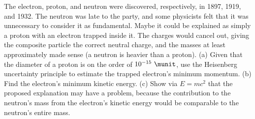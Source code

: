 The electron, proton, and neutron were discovered, respectively, in 1897, 1919, and 1932.
The neutron was late to the party, and 
some physicists felt that it was unnecessary to consider it as fundamental.
Maybe it could be explained
as simply a proton with an electron trapped inside it. The charges would cancel out,
giving the composite particle the correct neutral charge, and the masses at least
approximately made sense (a neutron is heavier than a proton). (a) Given that the
diameter of a proton is on the order of $10^{-15}\ \munit$, use the Heisenberg
uncertainty principle to estimate the trapped electron's minimum momentum.\answercheck\hwendpart
(b) Find the electron's minimum kinetic energy.\answercheck\hwendpart
(c) Show via $E=mc^2$ that the proposed explanation may have a problem,
because the
contribution to the neutron's mass from the electron's kinetic energy would be
comparable to the neutron's entire mass.
